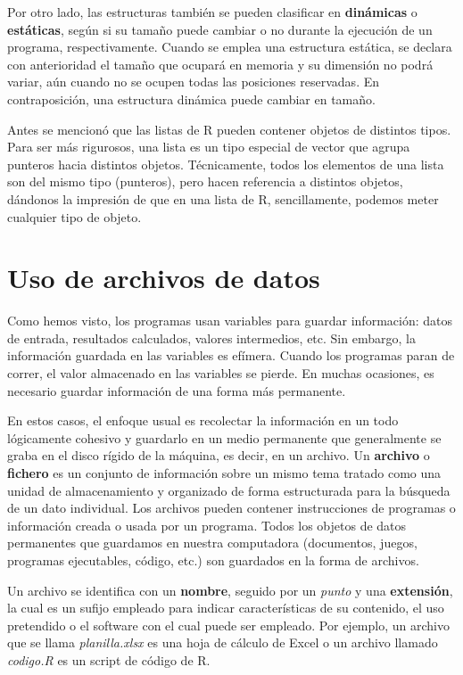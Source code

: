 \documentclass[
]{book}
\begin{document}
Por otro lado, las estructuras también se pueden clasificar en \textbf{dinámicas} o \textbf{estáticas}, según si su tamaño puede cambiar o no durante la ejecución de un programa, respectivamente. Cuando se emplea una estructura estática, se declara con anterioridad el tamaño que ocupará en memoria y su dimensión no podrá variar, aún cuando no se ocupen todas las posiciones reservadas. En contraposición, una estructura dinámica puede cambiar en tamaño.

Antes se mencionó que las listas de R pueden contener objetos de distintos tipos. Para ser más rigurosos, una lista es un tipo especial de vector que agrupa punteros hacia distintos objetos. Técnicamente, todos los elementos de una lista son del mismo tipo (punteros), pero hacen referencia a distintos objetos, dándonos la impresión de que en una lista de R, sencillamente, podemos meter cualquier tipo de objeto.

\hypertarget{uso-de-archivos-de-datos}{%
\chapter{Uso de archivos de datos}\label{uso-de-archivos-de-datos}}

Como hemos visto, los programas usan variables para guardar información: datos de entrada, resultados calculados, valores intermedios, etc. Sin embargo, la información guardada en las variables es efímera. Cuando los programas paran de correr, el valor almacenado en las variables se pierde. En muchas ocasiones, es necesario guardar información de una forma más permanente.

En estos casos, el enfoque usual es recolectar la información en un todo lógicamente cohesivo y guardarlo en un medio permanente que generalmente se graba en el disco rígido de la máquina, es decir, en un archivo. Un \textbf{archivo} o \textbf{fichero} es un conjunto de información sobre un mismo tema tratado como una unidad de almacenamiento y organizado de forma estructurada para la búsqueda de un dato individual. Los archivos pueden contener instrucciones de programas o información creada o usada por un programa. Todos los objetos de datos permanentes que guardamos en nuestra computadora (documentos, juegos, programas ejecutables, código, etc.) son guardados en la forma de archivos.

Un archivo se identifica con un \textbf{nombre}, seguido por un \emph{punto} y una \textbf{extensión}, la cual es un sufijo empleado para indicar características de su contenido, el uso pretendido o el software con el cual puede ser empleado. Por ejemplo, un archivo que se llama \emph{planilla.xlsx} es una hoja de cálculo de Excel o un archivo llamado \emph{codigo.R} es un script de código de R.
\end{document}
